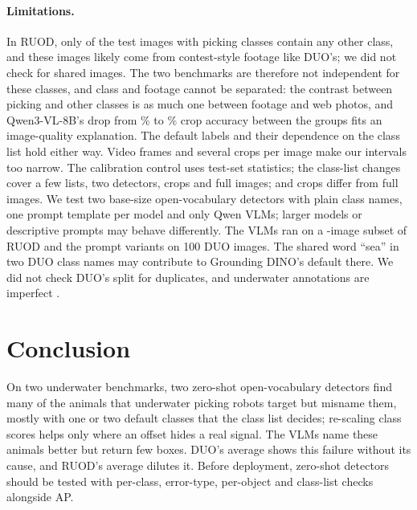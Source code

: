 \documentclass[letterpaper]{article} %
\begin{document}
\paragraph{Limitations.}
In RUOD, only \rMixedImages{} of the \rSeaImages{} test images with picking classes contain any other class, and these images likely come from contest-style footage like DUO's; we did not check for shared images. The two benchmarks are therefore not independent for these classes, and class and footage cannot be separated: the contrast between picking and other classes is as much one between footage and web photos, and Qwen3-VL-8B's drop from \rCropOthQwenVL\% to \rCropSeaQwenVL\% crop accuracy between the groups fits an image-quality explanation. The default labels and their dependence on the class list hold either way. Video frames and several crops per image make our intervals too narrow. The calibration control uses test-set statistics; the class-list changes cover a few lists, two detectors, \vCrops{} crops and \fvImages{} full images; and crops differ from full images. We test two base-size open-vocabulary detectors with plain class names, one prompt template per model and only Qwen VLMs; larger models or descriptive prompts \citep{tejeda2023zeroshot} may behave differently. The VLMs ran on a \rSubset-image subset of RUOD and the prompt variants on 100 DUO images. The shared word ``sea'' in two DUO class names may contribute to Grounding DINO's default there. We did not check DUO's split for duplicates, and underwater annotations are imperfect \citep{wille2026domain}.

\section{Conclusion}

On two underwater benchmarks, two zero-shot open-vocabulary detectors find many of the animals that underwater picking robots target but misname them, mostly with one or two default classes that the class list decides; re-scaling class scores helps only where an offset hides a real signal. The VLMs name these animals better but return few boxes. DUO's average shows this failure without its cause, and RUOD's average dilutes it. Before deployment, zero-shot detectors should be tested with per-class, error-type, per-object and class-list checks alongside AP.


\end{document}
